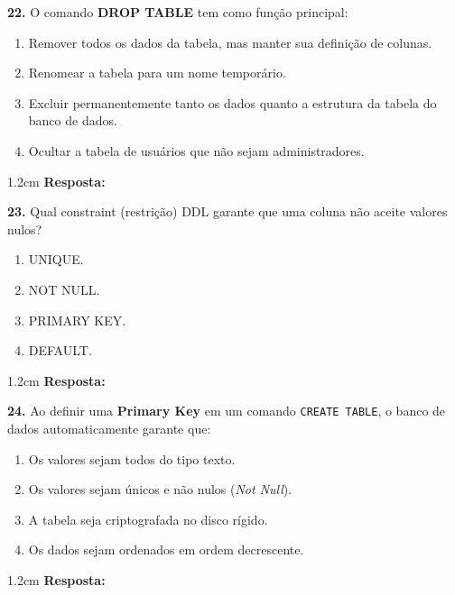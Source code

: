 \documentclass[12pt]{article}
\begin{document}
\vspace{0.3cm}

\textbf{22.} O comando \textbf{DROP TABLE} tem como função principal:
\begin{enumerate}[label=\Alph*)]
  \item Remover todos os dados da tabela, mas manter sua definição de colunas.
  \item Renomear a tabela para um nome temporário.
  \item Excluir permanentemente tanto os dados quanto a estrutura da tabela do banco de dados.
  \item Ocultar a tabela de usuários que não sejam administradores.
\end{enumerate}
\begin{resposta}{1.2cm} \textbf{Resposta:} \end{resposta}

\vspace{0.3cm}

\textbf{23.} Qual constraint (restrição) DDL garante que uma coluna não aceite valores nulos?
\begin{enumerate}[label=\Alph*)]
  \item UNIQUE.
  \item NOT NULL.
  \item PRIMARY KEY.
  \item DEFAULT.
\end{enumerate}
\begin{resposta}{1.2cm} \textbf{Resposta:} \end{resposta}



\textbf{24.} Ao definir uma \textbf{Primary Key} em um comando \texttt{CREATE TABLE}, o banco de dados automaticamente garante que:
\begin{enumerate}[label=\Alph*)]
  \item Os valores sejam todos do tipo texto.
  \item Os valores sejam únicos e não nulos (\textit{Not Null}).
  \item A tabela seja criptografada no disco rígido.
  \item Os dados sejam ordenados em ordem decrescente.
\end{enumerate}
\begin{resposta}{1.2cm} \textbf{Resposta:} \end{resposta}

\vspace{0.3cm}
\end{document}
